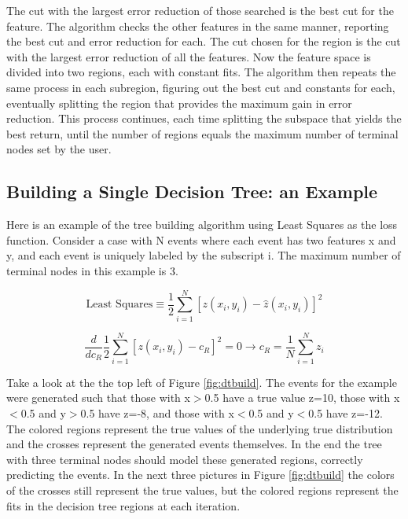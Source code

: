 \documentclass[12pt]{article}
\begin{document}
The cut with the largest error reduction of those searched is the best cut for the feature. The algorithm checks the other features in the same manner, reporting the best cut and error reduction for each. The cut chosen for the region is the cut with the largest error reduction of all the features. Now the feature space is divided into two regions, each with constant fits. The algorithm then repeats the same process in each subregion, figuring out the best cut and constants for each, eventually splitting the region that provides the maximum gain in error reduction. This process continues, each time splitting the subspace that yields the best return, until the number of regions equals the maximum number of terminal nodes set by the user. 

\subsection{Building a Single Decision Tree: an Example}

Here is an example of the tree building algorithm using Least Squares as the loss function. Consider a case with N events where each event has two features x and y, and each event is uniquely labeled by the subscript i. The maximum number of terminal nodes in this example is 3.

\begin{equation}
\textrm{Least Squares} \equiv \frac{1}{2}\sum_{i=1}^{N} [z(x_i,y_i)-\hat{z}(x_i,y_i)]^2
\end{equation}

\begin{equation}
\frac{d}{dc_R}\frac{1}{2}\sum_{i=1}^{N} [z(x_i,y_i)-c_R]^2 = 0 \rightarrow c_R = \frac{1}{N}\sum_{i=1}^{N}z_i
\end{equation}

Take a look at the the top left of Figure \ref{fig:dtbuild}. The events for the example were generated such that those with x$>$0.5 have a true value z=10, those with x$<$0.5 and y$>$0.5 have z=-8, and those with x$<$0.5 and y$<$0.5 have z=-12. The colored regions represent the true values of the underlying true distribution and the crosses represent the generated events themselves. In the end the tree with three terminal nodes should model these generated regions, correctly predicting the events. In the next three pictures in Figure \ref{fig:dtbuild} the colors of the crosses still represent the true values, but the colored regions represent the fits in the decision tree regions at each iteration.
\end{document}
